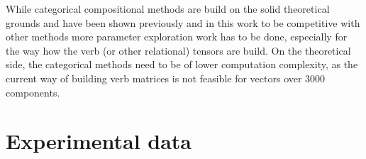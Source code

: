 \documentclass[11pt,a4paper,english,oneside]{book}
\renewcommand\cite\citep
\begin{document}
While categorical compositional methods are build on the solid theoretical grounds \cite{DBLP:journals/corr/abs-1003-4394} and have been shown previously \cite{Grefenstette:2011:ETV:2140490.2140497,kartsadrqpl2014,fried-polajnar-clark:2015:ACL-IJCNLP,kim2015neural,hashimoto-tsuruoka:2016:P16-1} and in this work to be competitive with other methods more parameter exploration work has to be done, especially for the way how the verb (or other relational) tensors are build. On the theoretical side, the categorical methods need to be of lower computation complexity, as the current way of building verb matrices is not feasible for vectors over 3000 components.


\cleardoublepage
\appendix

\chapter{Experimental data}
























\clearpage







\cleardoublepage
{}


\end{document}
